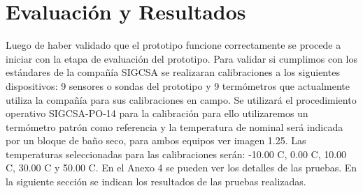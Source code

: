 \chapter{Evaluación y Resultados}

\par 
Luego de haber validado que el prototipo funcione correctamente se procede a iniciar con la etapa de evaluación del prototipo. Para validar si cumplimos con los estándares de la compañía SIGCSA se realizaran calibraciones a los siguientes dispositivos: 9 sensores o sondas del prototipo y 9 termómetros que actualmente utiliza la compañía para sus calibraciones en campo. Se utilizará el procedimiento operativo SIGCSA-PO-14 para la calibración para ello utilizaremos un termómetro patrón como referencia y la temperatura de nominal será indicada por un bloque de baño seco, para ambos equipos ver imagen 1.25.  Las temperaturas seleccionadas para las calibraciones serán: -10.00 C, 0.00 C, 10.00 C, 30.00 C y 50.00 C. En el Anexo 4 se pueden ver los detalles de las pruebas. En la siguiente sección se indican los resultados de las pruebas realizadas.






